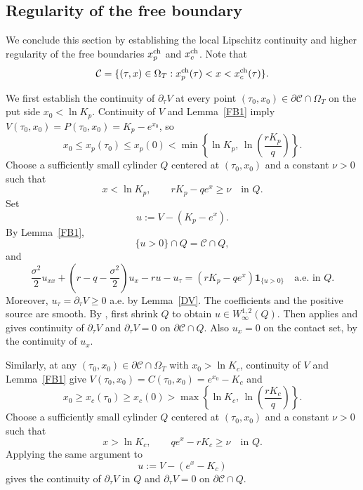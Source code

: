 \documentclass[11pt, a4paper, leqno]{amsart}
\numberwithin{equation}{section}
\theoremstyle{plain}
\theoremstyle{definition}
\theoremstyle{remark}
\def\leq{\leqslant}
\def\geq{\geqslant}
\begin{document}
{
\subsection{Regularity of the free boundary}

We conclude this section by establishing the local Lipschitz continuity
and higher regularity of the free boundaries
$x_p^{\rm ch}$ and $x_c^{\rm ch}$.
Note that
\begin{equation}\label{Cont reg}
    \mathcal{C}
    =
    \{(\tau,x)\in\Omega_T:
    x_p^{\rm ch}(\tau)<x<x_c^{\rm ch}(\tau)\}.
\end{equation}

{
{We first establish the continuity of $\partial_\tau V$ at every
point $(\tau_0,x_0)\in\partial\mathcal C\cap\Omega_T$ on the put side
$x_0<\ln K_p$. Continuity of $V$ and Lemma~\ref{FB1} imply
$V(\tau_0,x_0)=P(\tau_0,x_0)=K_p-e^{x_0}$, so}
\[
    {x_0}
    \leq x_p(\tau_0)
    \leq x_p(0)
    <
    \min\left\{
        \ln K_p,\,
        \ln\left(\frac{rK_p}{q}\right)
    \right\}.
\]
Choose a sufficiently small cylinder $Q$ centered at
{$(\tau_0,x_0)$} and a constant $\nu>0$ such that
\[
    x<\ln K_p,
    \qquad
    rK_p-qe^x\geq\nu
    \quad\text{in }Q.
\]
Set
\[
    u:=V-(K_p-e^x).
\]
By Lemma~\ref{FB1},
\[
    \{u>0\}\cap Q=\mathcal C\cap Q,
\]
and
\[
    \frac{\sigma^2}{2}u_{xx}
    +\left(r-q-\frac{\sigma^2}{2}\right)u_x
    -ru-u_\tau
    =
    (rK_p-qe^x)\mathbf1_{\{u>0\}}
    \quad\text{a.e. in }Q.
\]
Moreover, $u_\tau=\partial_\tau V\geq0$ a.e. by Lemma~\ref{DV}.
{The coefficients and the positive source are smooth. By
\cite[Theorem~1]{BDM2010erratum}, first shrink $Q$ to obtain
$u\in W_\infty^{1,2}(Q)$. Then
\cite[Theorem~1.2]{Blanchet2006-1} applies and gives continuity of
$\partial_\tau V$ and $\partial_\tau V=0$ on
$\partial\mathcal C\cap Q$. Also $u_x=0$ on the contact set,
by the continuity of $u_x$.}


{Similarly, at any $(\tau_0,x_0)\in\partial\mathcal C\cap\Omega_T$
with $x_0>\ln K_c$, continuity of $V$ and Lemma~\ref{FB1} give
$V(\tau_0,x_0)=C(\tau_0,x_0)=e^{x_0}-K_c$ and}
\[
    {x_0}
    \geq x_c(\tau_0)
    \geq x_c(0)
    >
    \max\left\{
        \ln K_c,\,
        \ln\left(\frac{rK_c}{q}\right)
    \right\}.
\]
Choose a sufficiently small cylinder $Q$ centered at
{$(\tau_0,x_0)$} and a constant $\nu>0$ such that
\[
    x>\ln K_c,
    \qquad
    qe^x-rK_c\geq\nu
    \quad\text{in }Q.
\]
Applying the same argument to
\[
    u:=V-(e^x-K_c)
\]
gives the continuity of $\partial_\tau V$ in $Q$ and
$\partial_\tau V=0$ on $\partial\mathcal C\cap Q$.
}

}
\end{document}
